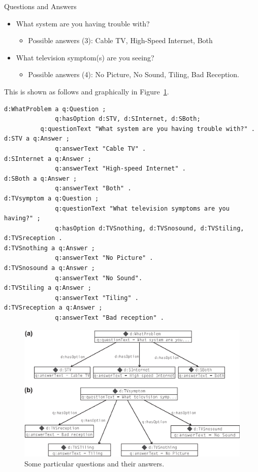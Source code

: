 \begin{example}{Questions and Answers}
\begin{itemize}
\item What system are you having trouble with?
\begin{itemize}
\item Possible answers (3): Cable TV, High-Speed Internet, Both
\end{itemize}

\item What television symptom(s) are you seeing?
\begin{itemize}
\item Possible answers (4): No Picture, No Sound, Tiling, Bad Reception.
\end{itemize}
\end{itemize}


This is shown as follows and graphically in Figure~\ref{fig:ch12.02}.

\begin{lstlisting}
d:WhatProblem a q:Question ;
              q:hasOption d:STV, d:SInternet, d:SBoth;  
	      q:questionText "What system are you having trouble with?" .
d:STV a q:Answer ;
              q:answerText "Cable TV" .
d:SInternet a q:Answer ;
              q:answerText "High-speed Internet" .
d:SBoth a q:Answer ;
              q:answerText "Both" .
d:TVsymptom a q:Question ;
              q:questionText "What television symptoms are you having?" ;
              q:hasOption d:TVSnothing, d:TVSnosound, d:TVStiling, d:TVSreception .
d:TVSnothing a q:Answer ;
              q:answerText "No Picture" .
d:TVSnosound a q:Answer ;
              q:answerText "No Sound".  
d:TVStiling a q:Answer ;
              q:answerText "Tiling" .
d:TVSreception a q:Answer ;
              q:answerText "Bad reception" .
\end{lstlisting}

\begin{figure}
\centering
\includegraphics[width=5in]{media/ch12/f12-02.eps}
\caption{Some particular questions and their answers.}
\label{fig:ch12.02}
\end{figure}




\end{example}
